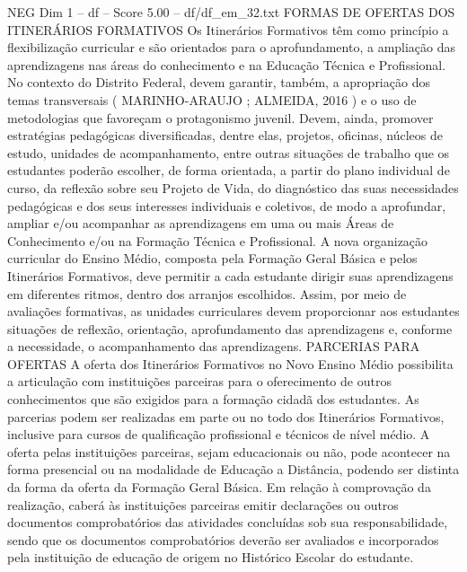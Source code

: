 \begin{textsample}{NEG Dim 1 – df – Score 5.00 – df/df\_em\_32.txt}  \label{ex:f1_neg_164}
FORMAS DE OFERTAS DOS ITINERÁRIOS FORMATIVOS Os Itinerários Formativos têm como princípio a flexibilização curricular e são orientados para o aprofundamento, a ampliação das aprendizagens nas áreas do conhecimento e na Educação Técnica e Profissional.
No contexto do Distrito Federal, devem garantir, também, a apropriação dos temas transversais ( MARINHO-ARAUJO ; ALMEIDA, 2016 ) e o uso de metodologias que favoreçam o protagonismo juvenil.
Devem, ainda, promover estratégias pedagógicas diversificadas, dentre elas, projetos, oficinas, núcleos de estudo, unidades de acompanhamento, entre outras situações de trabalho que os estudantes poderão escolher, de forma orientada, a partir do plano individual de curso, da reflexão sobre seu Projeto de Vida, do diagnóstico das suas necessidades pedagógicas e dos seus interesses individuais e coletivos, de modo a aprofundar, ampliar e/ou acompanhar as aprendizagens em uma ou mais Áreas de Conhecimento e/ou na Formação Técnica e Profissional.
A nova organização curricular do Ensino Médio, composta pela Formação Geral Básica e pelos Itinerários Formativos, deve permitir a cada estudante dirigir suas aprendizagens em diferentes ritmos, dentro dos arranjos escolhidos.
Assim, por meio de avaliações formativas, as unidades curriculares devem proporcionar aos estudantes situações de reflexão, orientação, aprofundamento das aprendizagens e, conforme a necessidade, o acompanhamento das aprendizagens.
PARCERIAS PARA OFERTAS A oferta dos Itinerários Formativos no Novo Ensino Médio possibilita a articulação com instituições parceiras para o oferecimento de outros conhecimentos que são exigidos para a formação cidadã dos estudantes.
As parcerias podem ser realizadas em parte ou no todo dos Itinerários Formativos, inclusive para cursos de qualificação profissional e técnicos de nível médio.
A oferta pelas instituições parceiras, sejam educacionais ou não, pode acontecer na forma presencial ou na modalidade de Educação a Distância, podendo ser distinta da forma da oferta da Formação Geral Básica.
Em relação à comprovação da realização, caberá às instituições parceiras emitir declarações ou outros documentos comprobatórios das atividades concluídas sob sua responsabilidade, sendo que os documentos comprobatórios deverão ser avaliados e incorporados pela instituição de educação de origem no Histórico Escolar do estudante.

\end{textsample}

